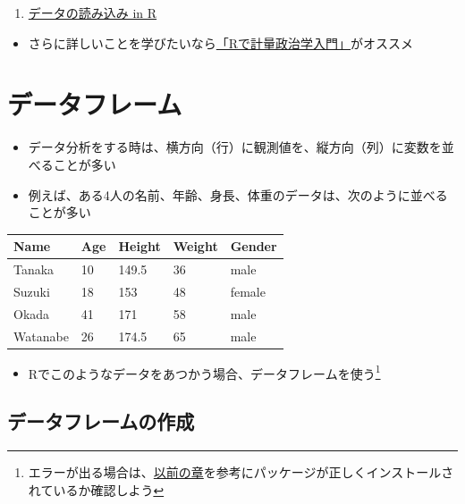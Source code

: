 \documentclass[
]{book}
\providecommand{\tightlist}{%
  \setlength{\itemsep}{0pt}\setlength{\parskip}{0pt}}
\begin{document}
\begin{enumerate}
\def\labelenumi{\arabic{enumi}.}
\tightlist
\item
  \href{https://youtu.be/FugazO_rL7c}{データの読み込み in R}
\end{enumerate}

\begin{itemize}
\tightlist
\item
  さらに詳しいことを学びたいなら\href{https://shohei-doi.github.io/quant_polisci/index.html}{「Rで計量政治学入門」}がオススメ
\end{itemize}

\hypertarget{ux30c7ux30fcux30bfux30d5ux30ecux30fcux30e0}{%
\section{データフレーム}\label{ux30c7ux30fcux30bfux30d5ux30ecux30fcux30e0}}

\begin{itemize}
\tightlist
\item
  データ分析をする時は、横方向（行）に観測値を、縦方向（列）に変数を並べることが多い
\item
  例えば、ある4人の名前、年齢、身長、体重のデータは、次のように並べることが多い
\end{itemize}

\begin{longtable}[]{@{}lllll@{}}
\toprule()
Name & Age & Height & Weight & Gender \\
\midrule()
\endhead
Tanaka & 10 & 149.5 & 36 & male \\
Suzuki & 18 & 153 & 48 & female \\
Okada & 41 & 171 & 58 & male \\
Watanabe & 26 & 174.5 & 65 & male \\
\bottomrule()
\end{longtable}

\begin{itemize}
\tightlist
\item
  Rでこのようなデータをあつかう場合、データフレームを使う\footnote{エラーが出る場合は、\protect\hyperlink{ux30d1ux30c3ux30b1ux30fcux30b8ux306eux30a4ux30f3ux30b9ux30c8ux30fcux30eb}{以前の章}を参考にパッケージが正しくインストールされているか確認しよう}
\end{itemize}

\hypertarget{ux30c7ux30fcux30bfux30d5ux30ecux30fcux30e0ux306eux4f5cux6210}{%
\subsection{データフレームの作成}\label{ux30c7ux30fcux30bfux30d5ux30ecux30fcux30e0ux306eux4f5cux6210}}
\end{document}
